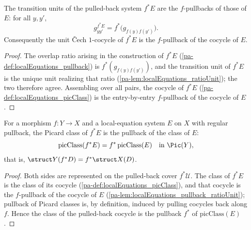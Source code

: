 \begin{lemma}
  \label{pa-lem:localEquations_pullback_ratioUnit}
  \leanok

  The transition units of the pulled-back system \(f^{*}E\) are the \(f\)-pullbacks of those of
  \(E\): for all \(y, y'\),
  \[
    g^{f^{*}E}_{y y'} = f^{*}\bigl(g_{f(y)f(y')}\bigr).
  \]
  Consequently the unit \v Cech \(1\)-cocycle of \(f^{*}E\) is the \(f\)-pullback of the cocycle of
  \(E\).
\end{lemma}
\begin{proof}
  \leanok
  The overlap ratio arising in the construction of \(f^{*}E\) (\ref{pa-def:localEquations_pullback})
  is \(f^{*}(g_{f(y)f(y')})\), and the transition unit of \(f^{*}E\) is the unique unit realizing
  that ratio (\ref{pa-lem:localEquations_ratioUnit}); the two therefore agree. Assembling over all
  pairs, the cocycle of \(f^{*}E\) (\ref{pa-def:localEquations_picClass}) is the entry-by-entry
  \(f\)-pullback of the cocycle of \(E\).
\end{proof}

\begin{theorem}
  \label{pa-thm:localEquations_picClass_pullback}
  \leanok

  For a morphism \(f \colon Y \to X\) and a local-equation system \(E\) on \(X\) with regular
  pullback, the Picard class of \(f^{*}E\) is the pullback of the class of \(E\):
  \[
    \mathrm{picClass}(f^{*}E) = f^{*}\,\mathrm{picClass}(E) \quad\text{in } \Pic(Y),
  \]
  that is, \(\struct Y(f^{*}D) = f^{*}\struct X(D)\).
\end{theorem}
\begin{proof}
  \leanok
  Both sides are represented on the pulled-back cover \(f^{*}\mathcal U\). The class of \(f^{*}E\)
  is the class of its cocycle (\ref{pa-def:localEquations_picClass}), and that cocycle is the
  \(f\)-pullback of the cocycle of \(E\) (\ref{pa-lem:localEquations_pullback_ratioUnit}); pullback of
  Picard classes is, by definition, induced by pulling cocycles back along \(f\). Hence the class
  of the pulled-back cocycle is the pullback \(f^{*}\) of \(\mathrm{picClass}(E)\).
\end{proof}

